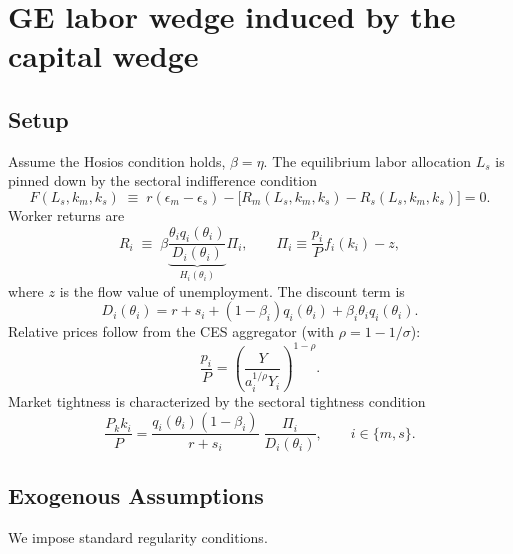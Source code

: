 \documentclass[12pt]{article} %
\theoremstyle{remark}
\begin{document}

\vspace{0.6cm}

\section*{GE labor wedge induced by the capital wedge}\label{app:GE_L_wedge}

\subsection*{Setup}\label{app:GE_L_setup}
Assume the Hosios condition holds, $\beta=\eta$. The equilibrium labor allocation $L_s$ is pinned down by the sectoral indifference condition
\begin{equation}\label{eq:SC_exact}
F(L_s, k_m, k_s) \;\equiv\; r(\epsilon_m - \epsilon_s) - \big[R_m(L_s, k_m, k_s) - R_s(L_s, k_m, k_s)\big] = 0.
\end{equation}
Worker returns are
\begin{equation}\label{eq:Ri_def}
R_i \;\equiv\; \beta \underbrace{\frac{\theta_i q_i(\theta_i)}{D_i(\theta_i)}}_{H_i(\theta_i)} \Pi_i,
\qquad 
\Pi_i \equiv \frac{p_i}{P}f_i(k_i) - z,
\end{equation}
where $z$ is the flow value of unemployment. The discount term is
\begin{equation}\label{eq:Di_def}
D_i(\theta_i)= r+s_i + (1-\beta_i)q_i(\theta_i)+\beta_i\theta_i q_i(\theta_i).
\end{equation}
Relative prices follow from the CES aggregator (with $\rho=1-1/\sigma$):
\begin{equation}\label{eq:CES_price}
\frac{p_i}{P} = \left( \frac{Y}{a_i^{1/\rho} Y_i} \right)^{1-\rho}.
\end{equation}
Market tightness is characterized by the sectoral tightness condition
\begin{equation}\label{eq:tightness_cond}
\frac{P_k k_i}{P}
= \frac{q_i(\theta_i)(1-\beta_i)}{r+s_i}\;
  \frac{\Pi_i}{D_i(\theta_i)}, \qquad i\in\{m,s\}.
\end{equation}

\subsection*{Exogenous Assumptions}\label{app:GE_L_assumptions}
We impose standard regularity conditions.
\end{document}
